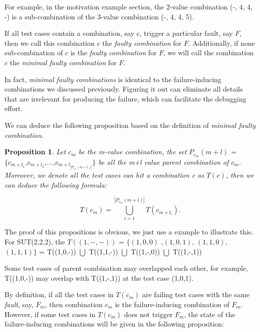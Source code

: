 \documentclass{sig-alternate}
\begin{document}
For example, in the motivation example section, the 2-value combination (-, 4, 4, -) is a sub-combination of the 3-value combination (-, 4, 4, 5).

\begin{definition}
If all test cases contain a combination, say $c$, trigger a particular fault, say $F$, then we call this combination $c$ the \emph{faulty combination} for $F$. Additionally, if none sub-combination of $c$ is the \emph{faulty combination} for $F$, we will call the combination $c$ the \emph{minimal faulty combination} for $F$.

\end{definition}

In fact, \emph{minimal faulty combinations} is identical to the failure-inducing combinations we discussed previously. Figuring it out can eliminate all details that are irrelevant for producing the failure, which can facilitate the debugging effort.


We can deduce the following proposition based on the definition of \emph{minimal faulty combination}.

\newtheorem{proposition}{Proposition}
\begin{proposition}
Let $c_{m}$ be the m-value combination, the set $P_{c_{m}}(m+l)$ = $ \{c_{m+l_{1}}$,$c_{m+l_{2}}$,...,$c_{m+l_{|P_{c_{m}}(m+l)|}}\}$ be all the m+l value parent combination of $c_{m}$. Moreover, we denote all the test cases can \emph{hit} a combination \emph{c} as $T(c)$,  then we can deduce the following formula:

\begin{displaymath} T(c_{m}) = \bigcup_{i = 1}^{|P_{c_{m}}(m+l)|} T(c_{m+l_{i}}).\end{displaymath}
 
\end{proposition}

The proof of this propositions is obvious, we just use a example to illustrate this. For SUT(2,2,2), the $T((1,-,-))$ = $\{(1,0,0)$ ,$(1,0,1)$, $(1,1,0)$, $(1,1,1)\}$ =  T((1,0,-)) $\bigcup$ T((1,1,-)) $\bigcup$ T((1,-,0)) $\bigcup$ T((1,-,1))

Some test cases of parent combination may overlapped each other, for example, T((1,0,-)) may overlap with T((1,-,1)) at the test case (1,0,1).

By definition, if all the test cases in $T(c_{m})$ are failing test cases with the same \emph{fault}, say,  $F_{m}$, then combination $c_{m}$ is the failure-inducing combination of $F_{m}$. However, if some test cases in $T(c_{m})$ does not trigger $F_{m}$, the state of the failure-inducing combinations will be given in the following proposition:
\end{document}
